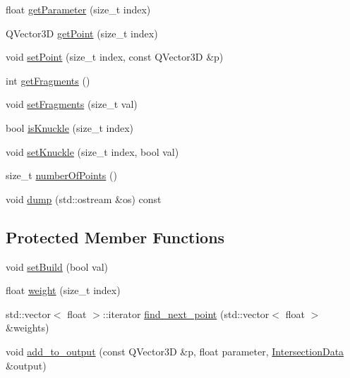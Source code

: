 \begin{DoxyCompactItemize}
float \hyperlink{classShipCADGeometry_1_1Spline_ac617856776bb267bdab050b56de4ec74}{get\-Parameter} (size\-\_\-t index)
\item 
Q\-Vector3\-D \hyperlink{classShipCADGeometry_1_1Spline_ad316be28cfd23e518f9e761c46644440}{get\-Point} (size\-\_\-t index)
\item 
void \hyperlink{classShipCADGeometry_1_1Spline_ae02af8d5473f952644ac5103d7beebf2}{set\-Point} (size\-\_\-t index, const Q\-Vector3\-D \&p)
\item 
int \hyperlink{classShipCADGeometry_1_1Spline_a489b034b416be54fe323ad021620f820}{get\-Fragments} ()
\item 
void \hyperlink{classShipCADGeometry_1_1Spline_aaae6e558fad0833cde71f9ed38e4fb96}{set\-Fragments} (size\-\_\-t val)
\item 
bool \hyperlink{classShipCADGeometry_1_1Spline_a90a954f52321f3b1b27b43991e9997a5}{is\-Knuckle} (size\-\_\-t index)
\item 
void \hyperlink{classShipCADGeometry_1_1Spline_ad4f075e2e8f1d3ac7c2d22b5be75bbad}{set\-Knuckle} (size\-\_\-t index, bool val)
\item 
size\-\_\-t \hyperlink{classShipCADGeometry_1_1Spline_a4f040e953d07359616c9342f2aff0029}{number\-Of\-Points} ()
\item 
void \hyperlink{classShipCADGeometry_1_1Spline_a156ffe855d149ad445b178078ee4451c}{dump} (std\-::ostream \&os) const 
\end{DoxyCompactItemize}
\subsection*{Protected Member Functions}
\begin{DoxyCompactItemize}
\item 
void \hyperlink{classShipCADGeometry_1_1Spline_a6e932411f0f4463514f80011c58f5e6a}{set\-Build} (bool val)
\item 
float \hyperlink{classShipCADGeometry_1_1Spline_a63165f7cf70338e51b0f16504366031e}{weight} (size\-\_\-t index)
\item 
std\-::vector$<$ float $>$\-::iterator \hyperlink{classShipCADGeometry_1_1Spline_a20b39f3a1bd853040df4760cd912ee64}{find\-\_\-next\-\_\-point} (std\-::vector$<$ float $>$ \&weights)
\item 
void \hyperlink{classShipCADGeometry_1_1Spline_ab8f0b98595ccbd62e754fe92354a207b}{add\-\_\-to\-\_\-output} (const Q\-Vector3\-D \&p, float parameter, \hyperlink{classShipCADGeometry_1_1IntersectionData}{Intersection\-Data} \&output)
\end{DoxyCompactItemize}
